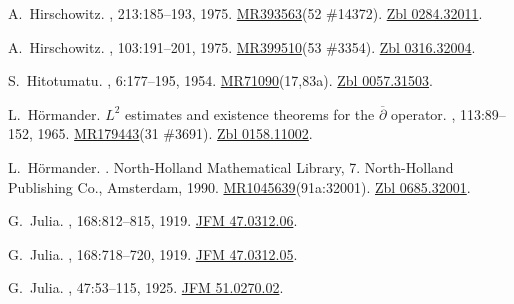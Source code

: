 \documentclass[11pt,a4paper, final, twoside]{article}
\numberwithin{equation}{section}
\begin{document}
\begin{appendices}
\begin{thebibliography}{100}
A.~Hirschowitz.
, 213:185--193, 1975.
\newblock \href{http://www.ams.org/mathscinet-getitem?mr=393563}{MR393563}(52
  \#14372). \href{http://zbmath.org/?q=an:0284.32011}{Zbl 0284.32011}.

A.~Hirschowitz.
,
  103:191--201, 1975.
\newblock \href{http://www.ams.org/mathscinet-getitem?mr=399510}{MR399510}(53
  \#3354). \href{http://zbmath.org/?q=an:0316.32004}{Zbl 0316.32004}.

S.~Hitotumatu.
, 6:177--195,
  1954.
\newblock
  \href{http://www.ams.org/mathscinet-getitem?mr=71090}{MR71090}(17,83a).
  \href{http://zbmath.org/?q=an:0057.31503}{Zbl 0057.31503}.

L.~H\"ormander.
\newblock ${L}^2$ estimates and existence theorems for the $\overline\partial$
  operator.
, 113:89--152, 1965.
\newblock \href{http://www.ams.org/mathscinet-getitem?mr=179443}{MR179443}(31
  \#3691). \href{http://zbmath.org/?q=an:0158.11002}{Zbl 0158.11002}.

L.~H{\"o}rmander.
.
\newblock North-Holland Mathematical Library, 7. North-Holland Publishing Co.,
  Amsterdam, 1990.
\newblock
  \href{http://www.ams.org/mathscinet-getitem?mr=1045639}{MR1045639}(91a:32001).
  \href{http://zbmath.org/?q=an:0685.32001}{Zbl 0685.32001}.

G.~Julia.
, 168:812--815, 1919.
\newblock \href{http://zbmath.org/?q=an:47.0312.06}{JFM 47.0312.06}.

G.~Julia.
, 168:718--720, 1919.
\newblock \href{http://zbmath.org/?q=an:47.0312.05}{JFM 47.0312.05}.

G.~Julia.
, 47:53--115, 1925.
\newblock \href{http://zbmath.org/?q=an:51.0270.02}{JFM 51.0270.02}.


\end{thebibliography}
\end{appendices}
\end{document}
